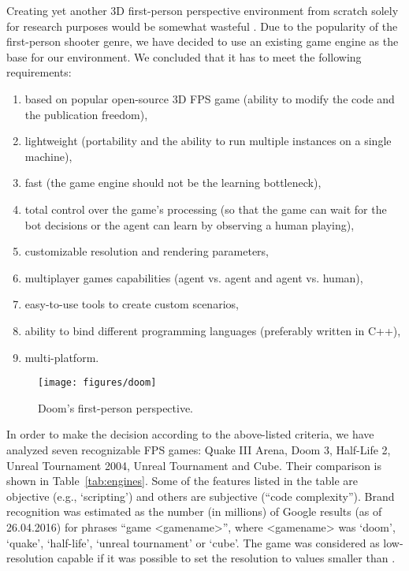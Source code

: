 \documentclass[english,american,conference, balance]{IEEEtran}
\begin{document}
Creating yet another 3D first-person perspective environment from
scratch solely for research purposes would be somewhat wasteful \cite{trenholme2008computer}.
Due to the popularity of the first-person shooter genre, we have decided
to use an existing game engine as the base for our environment. We
concluded that it has to meet the following requirements:
\begin{enumerate}
\item based on popular open-source 3D FPS game (ability to modify the code
and the publication freedom),
\item lightweight (portability and the ability to run multiple instances
on a single machine),
\item fast (the game engine should not be the learning bottleneck),
\item total control over the game's processing (so that the game can wait
for the bot decisions or the agent can learn by observing a human
playing),
\item customizable resolution and rendering parameters,
\item multiplayer games capabilities (agent vs. agent and agent vs. human),
\item easy-to-use tools to create custom scenarios,
\item ability to bind different programming languages (preferably written
in C++),
\item multi-platform.
\end{enumerate}
\begin{figure}
\centering{}\texttt{[image: figures/doom]}
\caption{\label{fig:doom}Doom's first-person perspective.}
\end{figure}

In order to make the decision according to the above-listed criteria,
we have analyzed seven recognizable FPS games: Quake III Arena, Doom
3, Half-Life 2, Unreal Tournament 2004, Unreal Tournament and Cube.
Their comparison is shown in Table~\ref{tab:engines}. Some of the
features listed in the table are objective (e.g., `scripting') and
others are subjective (``code complexity''). Brand recognition was
estimated as the number (in millions) of Google results (as of 26.04.2016)
for phrases ``game \textless{}gamename\textgreater{}'', where \textless{}gamename\textgreater{}
was `doom', `quake', `half-life', `unreal tournament' or `cube'. The
game was considered as low-resolution capable if it was possible to
set the resolution to values smaller than .
\end{document}
